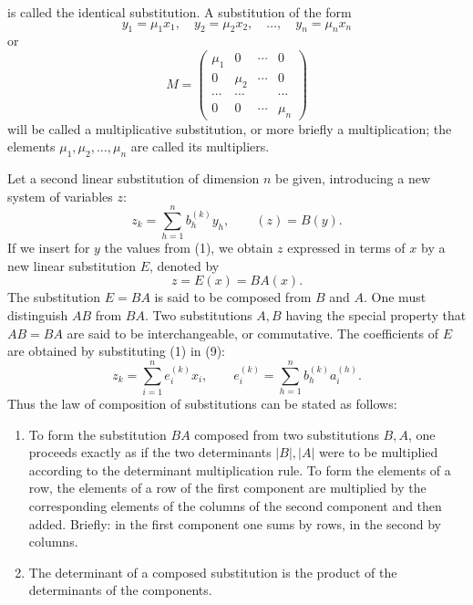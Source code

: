 \documentclass[11pt]{article}
\begin{document}
is called the identical substitution. A substitution of the form
\begin{equation}
y_1=\mu_1x_1,
\quad y_2=\mu_2x_2,
\quad\ldots,
\quad y_n=\mu_nx_n
\tag{7}
\end{equation}
or
\begin{equation}
M=\begin{pmatrix}
\mu_1&0&\cdots&0\\
0&\mu_2&\cdots&0\\
\cdots&\cdots&&\cdots\\
0&0&\cdots&\mu_n
\end{pmatrix}
\tag{8}
\end{equation}
will be called a multiplicative substitution, or more briefly a multiplication; the elements $\mu_1,\mu_2,\ldots,\mu_n$ are called its multipliers.

Let a second linear substitution of dimension $n$ be given, introducing a new system of variables $z$:
\begin{equation}
z_k=\sum_{h=1}^{n}b_h^{(k)}y_h,
\qquad
(z)=B(y).
\tag{9}
\end{equation}
If we insert for $y$ the values from (1), we obtain $z$ expressed in terms of $x$ by a new linear substitution $E$, denoted by
\begin{equation}
z=E(x)=BA(x).
\tag{10}
\end{equation}
The substitution $E=BA$ is said to be composed from $B$ and $A$. One must distinguish $AB$ from $BA$. Two substitutions $A,B$ having the special property that $AB=BA$ are said to be interchangeable, or commutative. The coefficients of $E$ are obtained by substituting (1) in (9):
\begin{equation}
z_k=\sum_{i=1}^{n}e_i^{(k)}x_i,
\qquad
 e_i^{(k)}=\sum_{h=1}^{n}b_h^{(k)}a_i^{(h)}.
\tag{11}
\end{equation}
Thus the law of composition of substitutions can be stated as follows:
\begin{enumerate}[label=\arabic*.,leftmargin=2.2em]
\item To form the substitution $BA$ composed from two substitutions $B,A$, one proceeds exactly as if the two determinants $|B|,|A|$ were to be multiplied according to the determinant multiplication rule. To form the elements of a row, the elements of a row of the first component are multiplied by the corresponding elements of the columns of the second component and then added. Briefly: in the first component one sums by rows, in the second by columns.
\item The determinant of a composed substitution is the product of the determinants of the components.
\end{enumerate}
\end{document}
